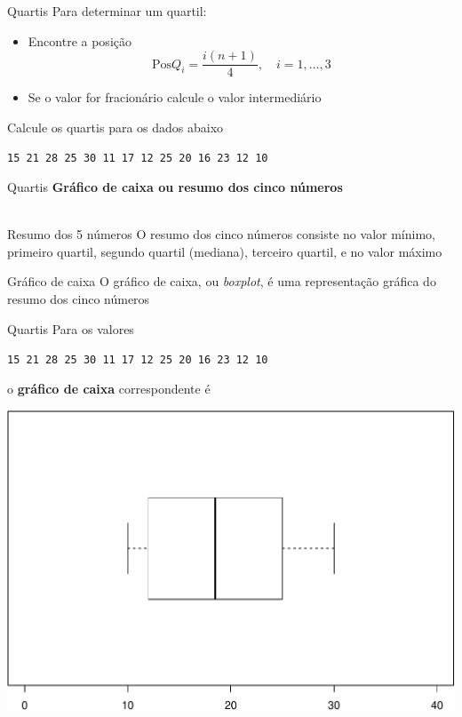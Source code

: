 \documentclass[10pt]{beamer}\usepackage[]{graphicx}\usepackage[]{color}
\newenvironment{knitrout}{}{} %
\theoremstyle{definition}
\begin{document}
\begin{frame}{Quartis}
  Para determinar um quartil:
  \begin{itemize}
  \item Encontre a posição
    \begin{equation*}
      \text{Pos} Q_i = \frac{i(n+1)}{4}, \quad i=1,\ldots,3
    \end{equation*}
  \item Se o valor for fracionário calcule o valor intermediário
  \end{itemize}
  Calcule os quartis para os dados abaixo
  \begin{center}
    \texttt{15 21 28 25 30 11 17 12 25 20 16 23 12 10}
  \end{center}

\end{frame}

\begin{frame}{Quartis}
  \textbf{Gráfico de caixa ou resumo dos cinco números}\\~\\
  \begin{block}{Resumo dos 5 números}
    O resumo dos cinco números consiste no valor mínimo, primeiro
    quartil, segundo quartil (mediana), terceiro quartil, e no valor
    máximo
  \end{block}
  \begin{block}{Gráfico de caixa}
    O gráfico de caixa, ou \textsl{boxplot}, é uma representação gráfica
    do resumo dos cinco números
  \end{block}
\end{frame}

\begin{frame}{Quartis}
  Para os valores
  \begin{center}
    \texttt{15 21 28 25 30 11 17 12 25 20 16 23 12 10}
  \end{center}
  o \textbf{gráfico de caixa} correspondente é
\begin{knitrout}\footnotesize
{}\color{fgcolor}

{\centering \includegraphics[width=.8\textwidth]{figure/unnamed-chunk-4-1} 

}



\end{knitrout}
\end{frame}
\end{document}
